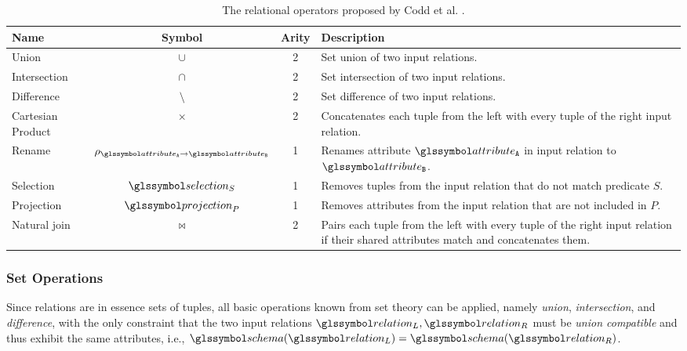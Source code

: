 \begin{table}
    \caption{The relational operators proposed by Codd et al. \cite{Codd:1970Relational,Garcia:2009Database}.}
    \label{table:relational_operators}
    \begin{tabular}{| l | c | c | p{80mm} |}
        \hline
       \textbf{Name} & \textbf{Symbol} & \textbf{Arity}  & \textbf{Description} \\ 
        \hline
        \hline
        Union & $\cup$  & 2 & Set union of two input relations. \\
        \hline
        Intersection & $\cap$  & 2 & Set intersection of two input relations. \\
        \hline
        Difference & $\setminus$  & 2 & Set difference of two input relations. \\
        \hline
        Cartesian Product & $\times$ & 2 & Concatenates each tuple from the left with every tuple of the right input relation. \\
        \hline
        Rename & $\rho_{\attribute_\mathtt{A} \rightarrow \attribute_\mathtt{B}}$ &  1 & Renames attribute $\attribute_\mathtt{A}$ in input relation to $\attribute_\mathtt{B}$. \\
        \hline
        Selection & $\selection_{S}$ &  1 & Removes tuples from the input relation that do not match predicate $S$. \\
        \hline
        Projection & $\projection_{P}$ &  1 & Removes attributes from the input relation that are not included in $P$. \\
        \hline
        Natural join & $\Join$ & 2 & Pairs each tuple from the left with every tuple of the right input relation if their shared attributes match and concatenates them. \\
        \hline
    \end{tabular}
\end{table}

\subsubsection{Set Operations}

Since relations are in essence sets of tuples, all basic operations known from set theory can be applied, namely \emph{union}, \emph{intersection}, and \emph{difference}, with the only constraint that the two input relations $\relation_L,\relation_R$ must be \emph{union compatible} and thus exhibit the same attributes, i.e., $\schema(\relation_L) = \schema(\relation_R)$.

